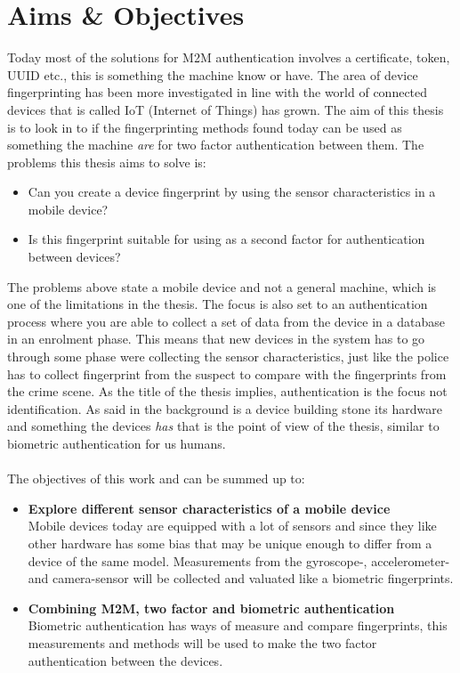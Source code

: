 \section{Aims \& Objectives}\label{sec:aim}
Today most of the solutions for M2M authentication involves a certificate, token, UUID etc., this is something the machine know or have. The area of device fingerprinting has been more investigated in line with the world of connected devices that is called IoT (Internet of Things) has grown. The aim of this thesis is to look in to if the fingerprinting methods found today can be used as something the machine \textit{are} for two factor authentication between them. The problems this thesis aims to solve is:
\begin{itemize}
	\item[] Can you create a device fingerprint by using the sensor characteristics in a mobile device?
	\item[] Is this fingerprint suitable for using as a second factor for authentication between devices?
\end{itemize}
The problems above state a mobile device and not a general machine, which is one of the limitations in the thesis. The focus is also set to an authentication process where you are able to collect a set of data from the device in a database in an enrolment phase. This means that new devices in the system has to go through some phase were collecting the sensor characteristics, just like the police has to collect fingerprint from the suspect to compare with the fingerprints from the crime scene. As the title of the thesis implies, authentication is the focus not identification. As said in the background is a device building stone its hardware and something the devices \textit{has} that is the point of view of the thesis, similar to biometric authentication for us humans. \\
\\
The objectives of this work and can be summed up to:
\begin{itemize}
	\item[] \textbf{Explore different sensor characteristics of a mobile device} \\
	Mobile devices today are equipped with a lot of sensors and since they like other hardware has some bias that may be unique enough to differ from a device of the same model. Measurements from the gyroscope-, accelerometer- and camera-sensor will be collected and valuated like a biometric fingerprints.
	\item[] \textbf{Combining M2M, two factor and biometric authentication} \\
	Biometric authentication has ways of measure and compare fingerprints, this measurements and methods will be used to make the two factor authentication between the devices.
\end{itemize}

